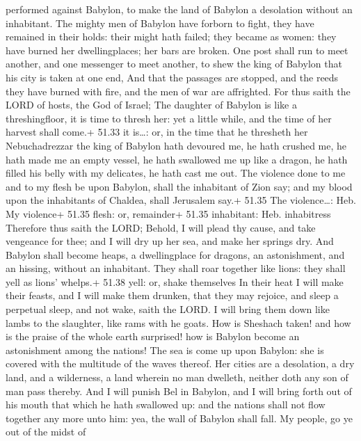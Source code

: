 performed against Babylon, to make the land of Babylon a desolation
without an inhabitant.  The mighty men of Babylon have
forborn to fight, they have remained in their holds: their might hath
failed; they became as women: they have burned her dwellingplaces; her
bars are broken.  One post shall run to meet another, and
one messenger to meet another, to shew the king of Babylon that his city
is taken at one end,  And that the passages are stopped,
and the reeds they have burned with fire, and the men of war are
affrighted.  For thus saith the LORD of hosts, the God of
Israel; The daughter of Babylon is like a threshingfloor, it is time to
thresh her: yet a little while, and the time of her harvest shall come.+
51.33 it is\ldots: or, in the time that he thresheth her 
Nebuchadrezzar the king of Babylon hath devoured me, he hath crushed me,
he hath made me an empty vessel, he hath swallowed me up like a dragon,
he hath filled his belly with my delicates, he hath cast me out.
 The violence done to me and to my flesh be upon Babylon,
shall the inhabitant of Zion say; and my blood upon the inhabitants of
Chaldea, shall Jerusalem say.+ 51.35 The violence\ldots: Heb. My
violence+ 51.35 flesh: or, remainder+ 51.35 inhabitant: Heb. inhabitress
 Therefore thus saith the LORD; Behold, I will plead thy
cause, and take vengeance for thee; and I will dry up her sea, and make
her springs dry.  And Babylon shall become heaps, a
dwellingplace for dragons, an astonishment, and an hissing, without an
inhabitant.  They shall roar together like lions: they
shall yell as lions' whelps.+ 51.38 yell: or, shake themselves
 In their heat I will make their feasts, and I will make
them drunken, that they may rejoice, and sleep a perpetual sleep, and
not wake, saith the LORD.  I will bring them down like
lambs to the slaughter, like rams with he goats.  How is
Sheshach taken! and how is the praise of the whole earth surprised! how
is Babylon become an astonishment among the nations!  The
sea is come up upon Babylon: she is covered with the multitude of the
waves thereof.  Her cities are a desolation, a dry land,
and a wilderness, a land wherein no man dwelleth, neither doth any son
of man pass thereby.  And I will punish Bel in Babylon, and
I will bring forth out of his mouth that which he hath swallowed up: and
the nations shall not flow together any more unto him: yea, the wall of
Babylon shall fall.  My people, go ye out of the midst of
